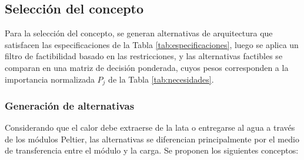 \documentclass[12pt, a4paper]{article}
\begin{document}
\newpage

\subsection{Selección del concepto}
Para la selección del concepto, se generan alternativas de arquitectura que satisfacen las especificaciones de la Tabla \ref{tab:especificaciones}, luego se aplica un filtro de factibilidad basado en las restricciones, y las alternativas factibles se comparan en una matriz de decisión ponderada, cuyos pesos corresponden a la importancia normalizada $P_j$ de la Tabla \ref{tab:necesidades}.

\subsubsection{Generación de alternativas}
Considerando que el calor debe extraerse de la lata o entregarse al agua a través de los módulos Peltier, las alternativas se diferencian principalmente por el medio de transferencia entre el módulo y la carga. Se proponen los siguientes conceptos:
\end{document}
